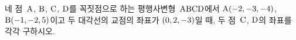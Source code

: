 네 점~$\mathrm{A}$, $\mathrm{B}$, $\mathrm{C}$, $\mathrm{D}$를 꼭짓점으로 하는 평행사변형~$\mathrm{ABCD}$에서 $\mathrm{A}(-2{,}\mkern3mu\mathopen{}-3{,}\mkern3mu\mathopen{}-4)$, $\mathrm{B}(-1{,}\mkern3mu\mathopen{}-2{,}\mkern3mu\mathopen{}5)$이고 두 대각선의 교점의 좌표가 $(0{,}\mkern3mu\mathopen{}2{,}\mkern3mu\mathopen{}-3)$일 때, 두 점~$\mathrm{C}$, $\mathrm{D}$의 좌표를 각각 구하시오.
